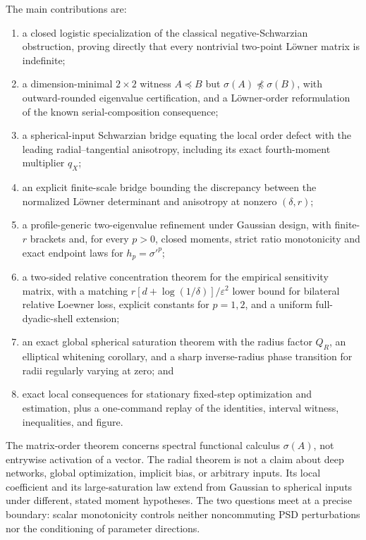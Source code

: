 \documentclass[11pt]{article}
\begin{document}
The main contributions are:
\begin{enumerate}[leftmargin=2em]
 \item a closed logistic specialization of the classical negative-Schwarzian obstruction, proving directly that
 every nontrivial two-point L\"owner matrix is indefinite;
 \item a dimension-minimal $2\times2$ witness $A\preceq B$ but $\sigma(A)\npreceq\sigma(B)$, with
 outward-rounded eigenvalue certification, and a L\"owner-order reformulation of the known serial-composition
 consequence;
 \item a spherical-input Schwarzian bridge equating the local order defect with the leading
 radial--tangential anisotropy, including its exact fourth-moment multiplier $q_X$;
 \item an explicit finite-scale bridge bounding the discrepancy between the normalized L\"owner determinant
 and anisotropy at nonzero $(\delta,r)$;
 \item a profile-generic two-eigenvalue refinement under Gaussian design, with finite-$r$ brackets and, for
 every $p>0$, closed moments, strict ratio monotonicity and exact endpoint laws for $h_p=\sigma'^p$;
 \item a two-sided relative concentration theorem for the empirical sensitivity matrix, with a matching
 $r[d+\log(1/\delta)]/\varepsilon^2$ lower bound for bilateral relative Loewner loss, explicit constants for
 $p=1,2$, and a uniform full-dyadic-shell extension;
 \item an exact global spherical saturation theorem with the radius factor $Q_R$, an elliptical whitening
 corollary, and a sharp inverse-radius phase transition for radii regularly varying at zero; and
 \item exact local consequences for stationary fixed-step optimization and estimation, plus a one-command replay
 of the identities,
 interval witness, inequalities, and figure.
\end{enumerate}

The matrix-order theorem concerns spectral functional calculus $\sigma(A)$, not entrywise activation of a vector.
The radial theorem is not a claim about deep networks, global optimization, implicit bias, or arbitrary inputs.  Its
local coefficient and its large-saturation law extend from Gaussian to spherical inputs under different, stated
moment hypotheses.  The
two questions meet at a precise boundary: scalar monotonicity controls neither noncommuting PSD perturbations nor
the conditioning of parameter directions.
\end{document}
